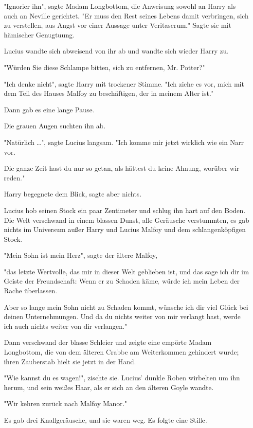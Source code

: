 {"Ignorier ihn", sagte Madam Longbottom, die Anweisung sowohl an Harry als auch an Neville gerichtet. "Er muss den Rest seines Lebens damit verbringen, sich zu verstellen, aus Angst vor einer Aussage unter Veritaserum." Sagte sie mit hämischer Genugtuung.

Lucius wandte sich abweisend von ihr ab und wandte sich wieder Harry zu.

"Würden Sie diese Schlampe bitten, sich zu entfernen, Mr. Potter?"

"Ich denke nicht", sagte Harry mit trockener Stimme. "Ich ziehe es vor, mich mit dem Teil des Hauses Malfoy zu beschäftigen, der in meinem Alter ist."

Dann gab es eine lange Pause.

Die grauen Augen suchten ihn ab.

"Natürlich …", sagte Lucius langsam. "Ich komme mir jetzt wirklich wie ein Narr vor.

Die ganze Zeit hast du nur so getan, als hättest du keine Ahnung, worüber wir reden."

Harry begegnete dem Blick, sagte aber nichts.

Lucius hob seinen Stock ein paar Zentimeter und schlug ihn hart auf den Boden. Die Welt verschwand in einem blassen Dunst, alle Geräusche verstummten, es gab nichts im Universum außer Harry und Lucius Malfoy und dem schlangenköpfigen Stock.

"Mein Sohn ist mein Herz", sagte der ältere Malfoy,

"das letzte Wertvolle, das mir in dieser Welt geblieben ist, und das sage ich dir im Geiste der Freundschaft: Wenn er zu Schaden käme, würde ich mein Leben der Rache überlassen.

Aber so lange mein Sohn nicht zu Schaden kommt, wünsche ich dir viel Glück bei deinen Unternehmungen. Und da du nichts weiter von mir verlangt hast, werde ich auch nichts weiter von dir verlangen."

Dann verschwand der blasse Schleier und zeigte eine empörte Madam Longbottom, die von dem älteren Crabbe am Weiterkommen gehindert wurde; ihren Zauberstab hielt sie jetzt in der Hand.

"Wie kannst du es wagen!", zischte sie. Lucius' dunkle Roben wirbelten um ihn herum, und sein weißes Haar, als er sich an den älteren Goyle wandte.

"Wir kehren zurück nach Malfoy Manor."

Es gab drei Knallgeräusche, und sie waren weg. Es folgte eine Stille.

}
